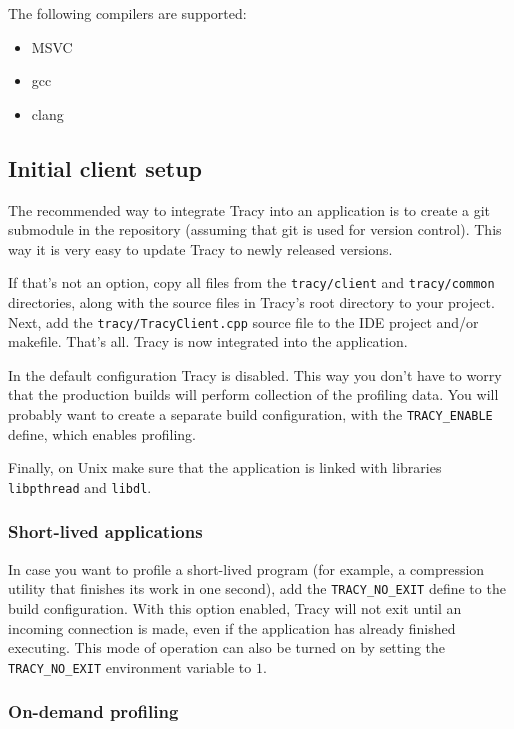 \documentclass[hidelinks,titlepage,a4paper]{article}
\begin{document}
The following compilers are supported:

\begin{itemize}
\item MSVC
\item gcc
\item clang
\end{itemize}

\subsection{Initial client setup}

The recommended way to integrate Tracy into an application is to create a git submodule in the repository (assuming that git is used for version control). This way it is very easy to update Tracy to newly released versions.

If that's not an option, copy all files from the \texttt{tracy/client} and \texttt{tracy/common} directories, along with the source files in Tracy's root directory to your project. Next, add the \texttt{tracy/TracyClient.cpp} source file to the IDE project and/or makefile. That's all. Tracy is now integrated into the application.

In the default configuration Tracy is disabled. This way you don't have to worry that the production builds will perform collection of the profiling data. You will probably want to create a separate build configuration, with the \texttt{TRACY\_ENABLE} define, which enables profiling.

Finally, on Unix make sure that the application is linked with libraries \texttt{libpthread} and \texttt{libdl}.

\subsubsection{Short-lived applications}

In case you want to profile a short-lived program (for example, a compression utility that finishes its work in one second), add the \texttt{TRACY\_NO\_EXIT} define to the build configuration. With this option enabled, Tracy will not exit until an incoming connection is made, even if the application has already finished executing. This mode of operation can also be turned on by setting the \texttt{TRACY\_NO\_EXIT} environment variable to $1$.

\subsubsection{On-demand profiling}
\label{ondemand}
\end{document}
